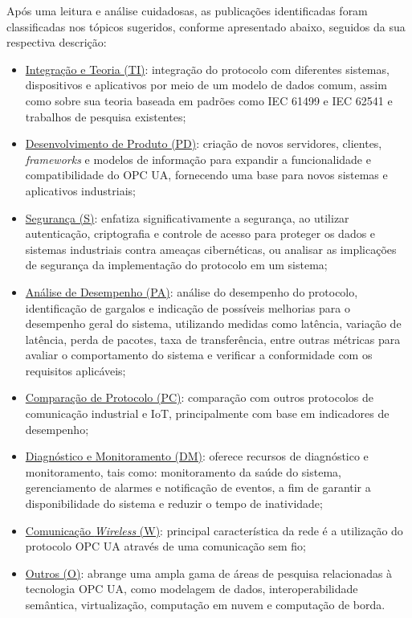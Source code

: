     Após uma leitura e análise cuidadosas, as publicações identificadas foram classificadas nos tópicos sugeridos, conforme apresentado abaixo, seguidos da sua respectiva descrição:

    \begin{itemize}
        \item \underline{Integração e Teoria (TI)}: integração do protocolo com diferentes sistemas, dispositivos e aplicativos por meio de um modelo de dados comum, assim como sobre sua teoria baseada em padrões como IEC 61499 e IEC 62541 e trabalhos de pesquisa existentes;
        \item \underline{Desenvolvimento de Produto (PD)}: criação de novos servidores, clientes, \textit{frameworks} e modelos de informação para expandir a funcionalidade e compatibilidade do OPC UA, fornecendo uma base para novos sistemas e aplicativos industriais;
        \item \underline{Segurança (S)}: enfatiza significativamente a segurança, ao utilizar autenticação, criptografia e controle de acesso para proteger os dados e sistemas industriais contra ameaças cibernéticas, ou analisar as implicações de segurança da implementação do protocolo em um sistema;
        \item \underline{Análise de Desempenho (PA)}: análise do desempenho do protocolo, identificação de gargalos e indicação de possíveis melhorias para o desempenho geral do sistema, utilizando medidas como latência, variação de latência, perda de pacotes, taxa de transferência, entre outras métricas para avaliar o comportamento do sistema e verificar a conformidade com os requisitos aplicáveis;
        \item \underline{Comparação de Protocolo (PC)}: comparação com outros protocolos de comunicação industrial e IoT, principalmente com base em indicadores de desempenho;
        \item \underline{Diagnóstico e Monitoramento (DM)}: oferece recursos de diagnóstico e monitoramento, tais como: monitoramento da saúde do sistema, gerenciamento de alarmes e notificação de eventos, a fim de garantir a disponibilidade do sistema e reduzir o tempo de inatividade;
        \item \underline{Comunicação \textit{Wireless} (W)}: principal característica da rede é a utilização do protocolo OPC UA através de uma comunicação sem fio;
        \item \underline{Outros (O)}: abrange uma ampla gama de áreas de pesquisa relacionadas à tecnologia OPC UA, como modelagem de dados, interoperabilidade semântica, virtualização, computação em nuvem e computação de borda.
    \end{itemize}

